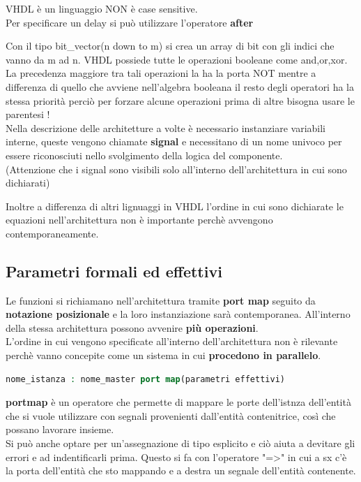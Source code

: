 \documentclass[a4paper]{book}
\begin{document}
VHDL è un linguaggio NON è case sensitive.\\

Per specificare un delay si può utilizzare l'operatore \textbf{after}

Con il tipo bit\_vector(n down to m) si crea un array di bit con gli indici che vanno da m ad n.
VHDL possiede tutte le operazioni booleane come and,or,xor.\\

La precedenza maggiore tra tali operazioni la ha la porta NOT mentre a differenza di quello che avviene nell'algebra booleana il resto degli operatori ha la stessa priorità perciò per forzare alcune operazioni prima di altre bisogna usare le parentesi !\\

Nella descrizione delle architetture a volte è necessario instanziare variabili interne, queste vengono chiamate \textbf{signal} e necessitano di un nome univoco per essere riconosciuti nello svolgimento della logica del componente.\\
(Attenzione che i signal sono visibili solo all'interno dell'architettura in cui sono dichiarati)

Inoltre a differenza di altri lignuaggi in VHDL l'ordine in cui sono dichiarate le equazioni nell'architettura non è importante perchè avvengono contemporaneamente.

\subsection{Parametri formali ed effettivi}

Le funzioni si richiamano nell'architettura tramite \textbf{port map} seguito da \textbf{notazione posizionale} e la loro instanziazione sarà contemporanea.
All'interno della stessa architettura possono avvenire \textbf{più operazioni}.\\
L'ordine in cui vengono specificate all'interno dell'architettura non è rilevante perchè vanno concepite come un sistema in cui \textbf{procedono in parallelo}.\\
\begin{lstlisting}[language=VHDL]
nome_istanza : nome_master port map(parametri effettivi)
\end{lstlisting}\vspace{\baselineskip}
\textbf{portmap} è un operatore che permette di mappare le porte dell'istnza dell'entità che si vuole utilizzare con segnali provenienti dall'entità contenitrice, così che possano lavorare insieme.\vspace{\baselineskip}\\
Si può anche optare per un'assegnazione di tipo esplicito e ciò aiuta a devitare gli errori e ad indentificarli prima.
Questo si fa con l'operatore "=>" in cui a sx c'è la porta dell'entità che sto mappando e a destra un segnale dell'entità contenente.
\end{document}
